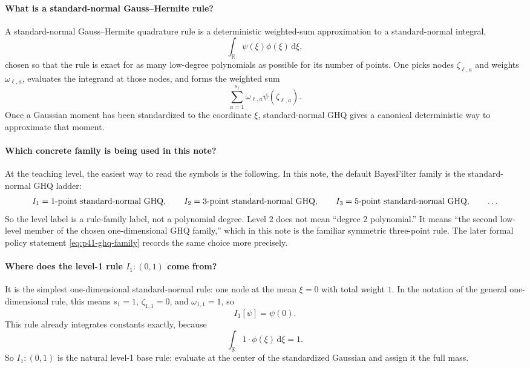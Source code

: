 \documentclass[11pt]{article}
\numberwithin{equation}{section}
\newcommand{\R}{\mathbb R}
\newcommand{\dd}{\,\mathrm d}
\begin{document}
\paragraph{What is a standard-normal Gauss--Hermite rule?}
A standard-normal Gauss--Hermite quadrature rule is a deterministic weighted-sum
approximation to a standard-normal integral,
\[
  \int_{\R}\psi(\xi)\phi(\xi)\dd\xi,
\]
chosen so that the rule is exact for as many low-degree polynomials as possible
for its number of points.  One picks nodes \(\zeta_{\ell,a}\) and weights
\(\omega_{\ell,a}\), evaluates the integrand at those nodes, and forms the
weighted sum
\[
  \sum_{a=1}^{s_\ell}\omega_{\ell,a}\psi(\zeta_{\ell,a}).
\]
Once a Gaussian moment has been standardized to the coordinate \(\xi\),
standard-normal GHQ gives a canonical deterministic way to approximate that
moment.

\paragraph{Which concrete family is being used in this note?}
At the teaching level, the easiest way to read the symbols is the following.  In
this note, the default BayesFilter family is the standard-normal GHQ ladder:
\[
  I_1=\hbox{1-point standard-normal GHQ},
  \qquad
  I_2=\hbox{3-point standard-normal GHQ},
  \qquad
  I_3=\hbox{5-point standard-normal GHQ},
  \qquad \ldots
\]
So the level label is a rule-family label, not a polynomial degree.  Level 2 does
not mean ``degree 2 polynomial.''  It means ``the second low-level member of the
chosen one-dimensional GHQ family,'' which in this note is the familiar symmetric
three-point rule.  The later formal policy statement \eqref{eq:p41-ghq-family}
records the same choice more precisely.

\paragraph{Where does the level-1 rule \texorpdfstring{$I_1:(0,1)$}{I1:(0,1)} come from?}
It is the simplest one-dimensional standard-normal rule: one node at the mean
\(\xi=0\) with total weight \(1\).  In the notation of the general one-dimensional
rule, this means \(s_1=1\), \(\zeta_{1,1}=0\), and \(\omega_{1,1}=1\), so
\[
  I_1[\psi]=\psi(0).
\]
This rule already integrates constants exactly, because
\[
  \int_{\R}1\cdot\phi(\xi)\dd\xi=1.
\]
So \(I_1:(0,1)\) is the natural level-1 base rule: evaluate at the center of
the standardized Gaussian and assign it the full mass.
\end{document}
